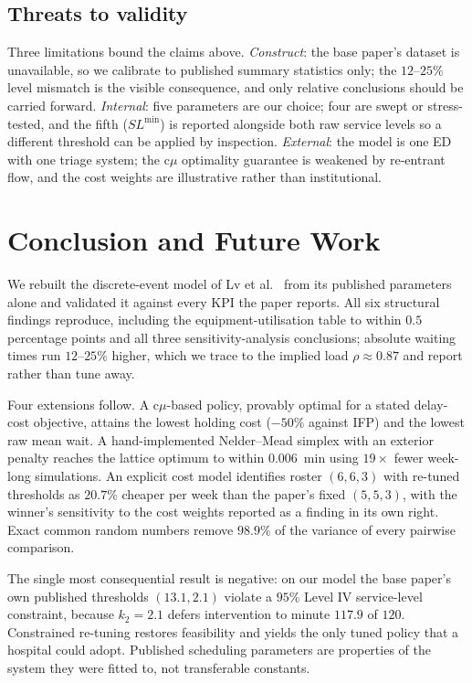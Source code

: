 \documentclass[sigconf,nonacm]{acmart}
\begin{document}
\subsection{Threats to validity}
Three limitations bound the claims above. \emph{Construct}: the base paper's
dataset is unavailable, so we calibrate to published summary statistics only;
the $12$--$25\%$ level mismatch is the visible consequence, and only relative
conclusions should be carried forward. \emph{Internal}: five parameters are our
choice; four are swept or stress-tested, and the fifth ($SL^{\min}$) is
reported alongside both raw service levels so a different threshold can be
applied by inspection. \emph{External}: the model is one ED with one triage
system; the c$\mu$ optimality guarantee is weakened by re-entrant flow, and the
cost weights are illustrative rather than institutional.

\section{Conclusion and Future Work}

We rebuilt the discrete-event model of Lv et al.~\cite{lv2026des} from its
published parameters alone and validated it against every KPI the paper
reports. All six structural findings reproduce, including the
equipment-utilisation table to within $0.5$ percentage points and all three
sensitivity-analysis conclusions; absolute waiting times run $12$--$25\%$
higher, which we trace to the implied load $\rho\approx0.87$ and report rather
than tune away.

Four extensions follow. A c$\mu$-based policy, provably optimal for a stated
delay-cost objective, attains the lowest holding cost ($-50\%$ against IFP) and
the lowest raw mean wait. A hand-implemented Nelder--Mead simplex with an
exterior penalty reaches the lattice optimum to within $0.006$~min using
$19\times$ fewer week-long simulations. An explicit cost model identifies
roster $(6,6,3)$ with re-tuned thresholds as $20.7\%$ cheaper per week than the
paper's fixed $(5,5,3)$, with the winner's sensitivity to the cost weights
reported as a finding in its own right. Exact common random numbers remove
$98.9\%$ of the variance of every pairwise comparison.

The single most consequential result is negative: on our model the base paper's
own published thresholds $(13.1, 2.1)$ violate a $95\%$ Level IV service-level
constraint, because $k_2 = 2.1$ defers intervention to minute $117.9$ of $120$.
Constrained re-tuning restores feasibility and yields the only tuned policy
that a hospital could adopt. Published scheduling parameters are properties of
the system they were fitted to, not transferable constants.
\end{document}
